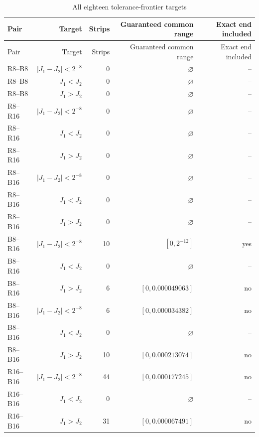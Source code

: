 {\footnotesize\setlength{\tabcolsep}{3pt}
\begin{longtable}{lrrrr}
\caption{All eighteen tolerance-frontier targets}\label{tab:frontier-all83}\\
\hline
Pair & Target & Strips & Guaranteed common range & Exact end included \\
\hline
\endfirsthead
\hline
Pair & Target & Strips & Guaranteed common range & Exact end included \\
\hline
\endhead
R8--B8 & $|J_1-J_2|<2^{-8}$ & 0 & $\varnothing$ & -- \\
R8--B8 & $J_1<J_2$ & 0 & $\varnothing$ & -- \\
R8--B8 & $J_1>J_2$ & 0 & $\varnothing$ & -- \\
R8--R16 & $|J_1-J_2|<2^{-8}$ & 0 & $\varnothing$ & -- \\
R8--R16 & $J_1<J_2$ & 0 & $\varnothing$ & -- \\
R8--R16 & $J_1>J_2$ & 0 & $\varnothing$ & -- \\
R8--B16 & $|J_1-J_2|<2^{-8}$ & 0 & $\varnothing$ & -- \\
R8--B16 & $J_1<J_2$ & 0 & $\varnothing$ & -- \\
R8--B16 & $J_1>J_2$ & 0 & $\varnothing$ & -- \\
B8--R16 & $|J_1-J_2|<2^{-8}$ & 10 & $[0,2^{-12}]$ & yes \\
B8--R16 & $J_1<J_2$ & 0 & $\varnothing$ & -- \\
B8--R16 & $J_1>J_2$ & 6 & $[0,0.000049063]$ & no \\
B8--B16 & $|J_1-J_2|<2^{-8}$ & 6 & $[0,0.000034382]$ & no \\
B8--B16 & $J_1<J_2$ & 0 & $\varnothing$ & -- \\
B8--B16 & $J_1>J_2$ & 10 & $[0,0.000213074]$ & no \\
R16--B16 & $|J_1-J_2|<2^{-8}$ & 44 & $[0,0.000177245]$ & no \\
R16--B16 & $J_1<J_2$ & 0 & $\varnothing$ & -- \\
R16--B16 & $J_1>J_2$ & 31 & $[0,0.000067491]$ & no \\
\hline\end{longtable}}
